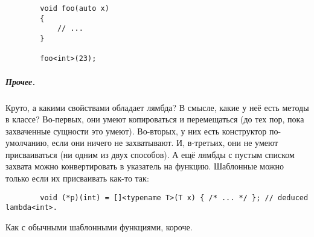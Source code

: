 \documentclass{article}
\begin{document}
    \begin{verbatim}
        void foo(auto x)
        {
            // ...
        }

        foo<int>(23);
    \end{verbatim}
    \subparagraph{Прочее.}
    Круто, а какими свойствами обладает лямбда? В смысле, какие у неё есть методы в классе? Во-первых, они умеют копироваться и перемещаться (до тех пор, пока захваченные сущности это умеют). Во-вторых, у них есть конструктор по-умолчанию, если они ничего не захватывают. И, в-третьих, они не умеют присваиваться (ни одним из двух способов). А ещё лямбды с пустым списком захвата можно конвертировать в указатель на функцию. Шаблонные можно только если их присваивать как-то так:
    \begin{verbatim}
        void (*p)(int) = []<typename T>(T x) { /* ... */ }; // deduced lambda<int>.
    \end{verbatim}
    Как с обычными шаблонными функциями, короче.
\end{document}
